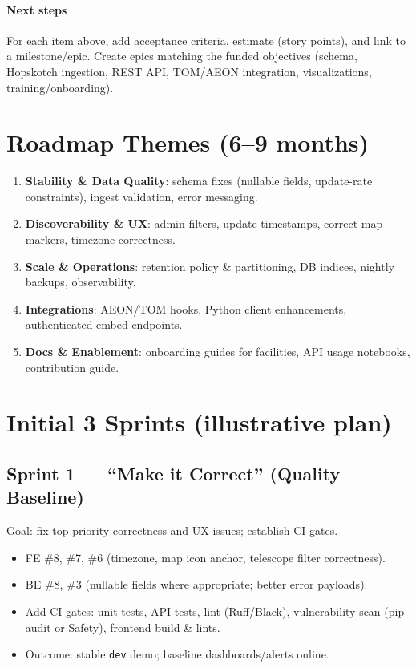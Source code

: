 \documentclass[11pt]{article}
\begin{document}
\paragraph{Next steps} For each item above, add acceptance criteria, estimate (story points), and link to a milestone/epic. Create epics matching the funded objectives (schema, Hopskotch ingestion, REST API, TOM/AEON integration, visualizations, training/onboarding).

\section{Roadmap Themes (6--9 months)}
\begin{enumerate}[leftmargin=1.2em]
  \item \textbf{Stability \& Data Quality}: schema fixes (nullable fields, update-rate constraints), ingest validation, error messaging.
  \item \textbf{Discoverability \& UX}: admin filters, update timestamps, correct map markers, timezone correctness.
  \item \textbf{Scale \& Operations}: retention policy \& partitioning, DB indices, nightly backups, observability.
  \item \textbf{Integrations}: AEON/TOM hooks, Python client enhancements, authenticated embed endpoints.
  \item \textbf{Docs \& Enablement}: onboarding guides for facilities, API usage notebooks, contribution guide.
\end{enumerate}

\section{Initial 3 Sprints (illustrative plan)}
\subsection*{Sprint 1 --- ``Make it Correct'' (Quality Baseline)}
Goal: fix top-priority correctness and UX issues; establish CI gates.
\begin{itemize}[leftmargin=1.2em]
  \item FE \#8, \#7, \#6 (timezone, map icon anchor, telescope filter correctness).
  \item BE \#8, \#3 (nullable fields where appropriate; better error payloads).
  \item Add CI gates: unit tests, API tests, lint (Ruff/Black), vulnerability scan (pip-audit or Safety), frontend build \& lints.
  \item Outcome: stable \texttt{dev} demo; baseline dashboards/alerts online.
\end{itemize}
\end{document}
